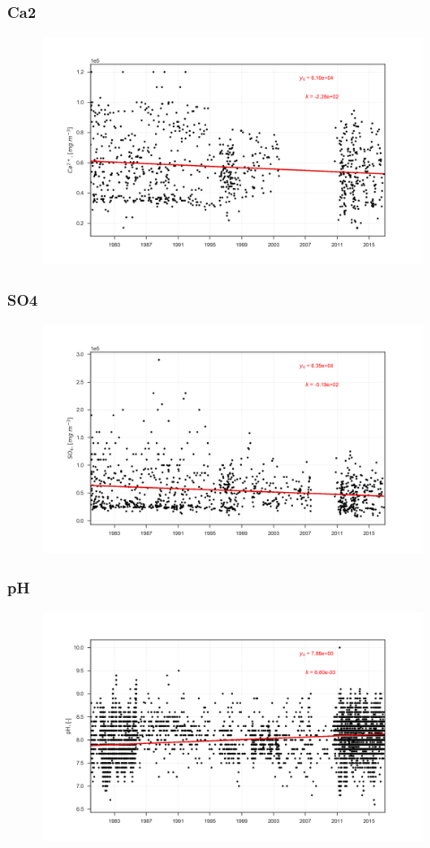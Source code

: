 \documentclass{beamer}
\begin{document}
\begin{frame}
\frametitle{Ca2}
\begin{figure}
\includegraphics[width=\textwidth]{rivers/all/all_years/Ca2.png}
\end{figure}
\end{frame}

\begin{frame}
\frametitle{SO4}
\begin{figure}
\includegraphics[width=\textwidth]{rivers/all/all_years/SO4.png}
\end{figure}
\end{frame}

\begin{frame}
\frametitle{pH}
\begin{figure}
\includegraphics[width=\textwidth]{rivers/all/all_years/pH.png}
\end{figure}
\end{frame}
\end{document}

